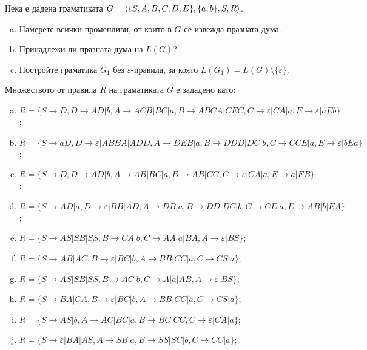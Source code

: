 \begin{problem}
  Нека е дадена граматиката  $G = \langle{\{S,A,B,C,D,E\}, \{a,b\},S, R}\rangle$.
  \begin{enumerate}[a)]
  \item
    Намерете всички променливи, от които в $G$ се извежда празната дума.
  \item
    Принадлежи ли празната дума на $L(G)$?
  \item
    Постройте граматика $G_1$ без $\varepsilon$-правила, за която $L(G_1)=L(G)\setminus\{\varepsilon\}$.
  \end{enumerate}
  Множеството от правила $R$ на граматиката $G$ е зададено като:
  \begin{enumerate}[a)]
  \item
    $R = \{S\rightarrow D,D\rightarrow AD|b,A\rightarrow ACB|BC|a, B\rightarrow ABCA|CEC,C\rightarrow \varepsilon|CA|a, E\rightarrow \varepsilon|aEb\}$;
  \item
    $R = \{S \rightarrow aD, D\rightarrow \varepsilon|ABBA|ADD,A\rightarrow DEB|a,B\rightarrow DDD|DC|b,C\rightarrow CCE|a, E\rightarrow \varepsilon|bEa\}$;
  \item
    $R = \{ S\rightarrow D,D\rightarrow AD|b,A\rightarrow AB|BC|a, B\rightarrow AB|CC, C\rightarrow \varepsilon|CA|a, E\rightarrow a|EB\}$;
  \item
    $R = \{ S \rightarrow AD|a, D\rightarrow \varepsilon|BB|AD,A\rightarrow DB|a,B\rightarrow DD|DC|b,C\rightarrow CE|a, E\rightarrow AB|b|EA\}$;
  \item
    $R =\{S\rightarrow AS|SB|SS,B\rightarrow CA|b, C\rightarrow AA|a|BA,A\rightarrow \varepsilon|BS\}$;
  \item
    $R = \{S\rightarrow AB|AC,B\rightarrow \varepsilon |BC|b,A\rightarrow BB|CC|a,C\rightarrow CS|a\}$;
  \item
    $R = \{S\rightarrow AS|SB|SS,B\rightarrow AC|b, C\rightarrow A|a|AB,A\rightarrow \varepsilon|BS\}$;
  \item
    $R = \{S\rightarrow BA|CA,B\rightarrow \varepsilon |BC|b,A\rightarrow BB|CC|a, C\rightarrow CS|a\}$;
  \item
    $R = \{S\rightarrow AS|b,A\rightarrow AC|BC|a, B\rightarrow BC|CC,C\rightarrow \varepsilon|CA|a\}$;
  \item
    $R = \{S\rightarrow \varepsilon|BA|AS,A\rightarrow SB|a,B\rightarrow SS|SC|b,
    C\rightarrow CC|a\}$; 
  \end{enumerate}
\end{problem}

